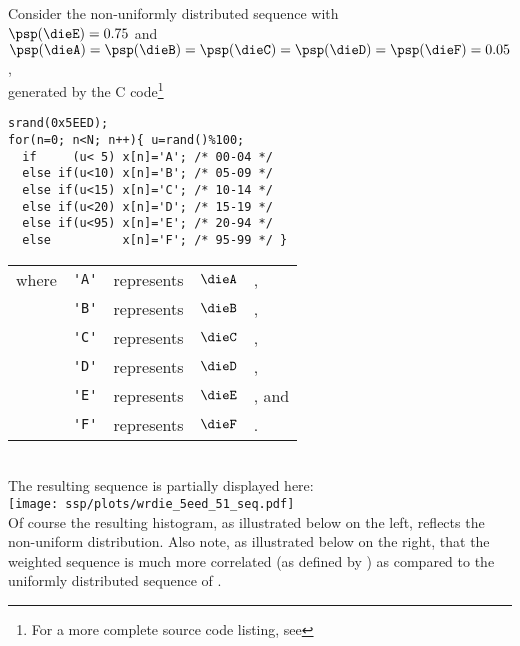 \begin{example}
\label{ex:wrdie_sha}
Consider the non-uniformly distributed   sequence with 
    \\\indentx$\psp(\dieE)=0.75$ and $\psp(\dieA)=\psp(\dieB)=\psp(\dieC)=\psp(\dieD)=\psp(\dieF)=0.05$,\\
    generated by the C code\footnote{For a more complete source code listing, see }
\\\begin{minipage}{85mm}%
\begin{lstlisting}
srand(0x5EED);
for(n=0; n<N; n++){ u=rand()%100;
  if     (u< 5) x[n]='A'; /* 00-04 */ 
  else if(u<10) x[n]='B'; /* 05-09 */ 
  else if(u<15) x[n]='C'; /* 10-14 */ 
  else if(u<20) x[n]='D'; /* 15-19 */ 
  else if(u<95) x[n]='E'; /* 20-94 */ 
  else          x[n]='F'; /* 95-99 */ }
\end{lstlisting}
\end{minipage}%
\hspace{10mm}%
\begin{tabular}{lclcl}
  where & \lstinline!'A'! &represents& $\dieA$ &,
     \\ & \lstinline!'B'! &represents& $\dieB$ &,
     \\ & \lstinline!'C'! &represents& $\dieC$ &,
     \\ & \lstinline!'D'! &represents& $\dieD$ &,
     \\ & \lstinline!'E'! &represents& $\dieE$ &, and
     \\ & \lstinline!'F'! &represents& $\dieF$ &.
\end{tabular}
\\
     The resulting sequence is partially displayed here:
  \\\texttt{[image: ssp/plots/wrdie\_5eed\_51\_seq.pdf]}\\
  Of course the resulting histogram, as illustrated below on the left, reflects the non-uniform distribution.
  Also note, as illustrated below on the right, that the weighted sequence is much more correlated 
  (as defined by )
  as compared to the uniformly distributed 
   sequence of .

\end{example}
